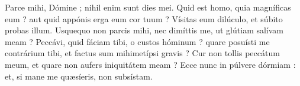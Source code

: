 
Parce mihi, Dómine ; nihil enim sunt dies mei.
Quid est homo, quia magníficas eum ? aut quid appónis erga eum cor tuum ?
Vísitas eum dilúculo, et súbito probas illum.
Usquequo non parcis mihi, nec dimíttis me, ut glútiam salívam meam ?
Peccávi, quid fáciam tibi, o custos hóminum ? quare posuísti me contrárium tibi, et factus sum mihimetípsi gravis ?
Cur non tollis peccátum meum, et quare non aufers iniquitátem meam ? Ecce nunc in púlvere dórmiam : et, si mane me quæsíeris, non subsístam.